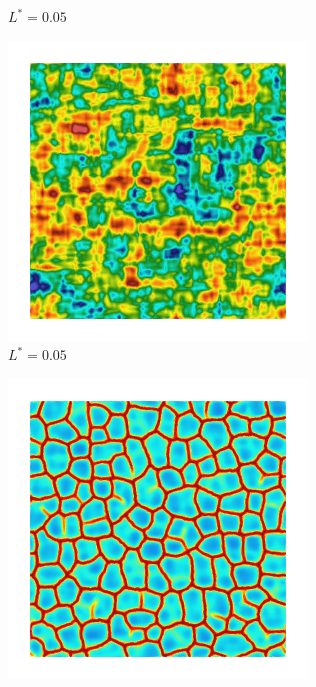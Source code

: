 \begin{figure}[!htbp]
\begin{subfigure}[b]{0.15\textwidth}
    \caption{$L^* = 0.05$}
    \label{fig: Chapter4/2D/Gc_exp_cartesian_5_5_rho_0_seed_b}
  \end{subfigure}
  \begin{subfigure}[b]{0.15\textwidth}
    \includegraphics[width=\textwidth]{Chapter4/figures/2D/psic_exp_cartesian_5_5_rho_0_seed_b.png}
    \caption{$L^* = 0.05$}
    \label{fig: Chapter4/2D/psic_exp_cartesian_5_5_rho_0_seed_b}
  \end{subfigure}
  \begin{subfigure}[b]{0.15\textwidth}
    \includegraphics[width=\textwidth]{Chapter4/figures/2D/d_exp_cartesian_5_5_rho_0_seed_b.png}
    \caption{}
    \label{fig: Chapter4/2D/d_exp_cartesian_5_5_rho_0_seed_b}
  \end{subfigure}
  

\end{figure}
